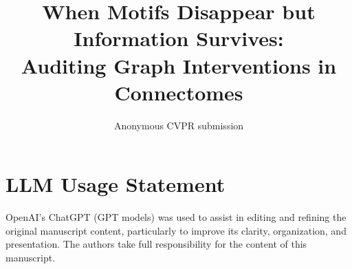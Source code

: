 \documentclass[10pt,twocolumn,letterpaper]{article}
\title{When Motifs Disappear but Information Survives:\\Auditing Graph Interventions in Connectomes}
\author{Anonymous CVPR submission}
\begin{document}
\maketitle








\clearpage
\section*{LLM Usage Statement}
OpenAI's ChatGPT (GPT models) was used to assist in editing and refining the
original manuscript content, particularly to improve its clarity,
organization, and presentation. The authors take full responsibility for
the content of this manuscript.
{\small}
\end{document}
